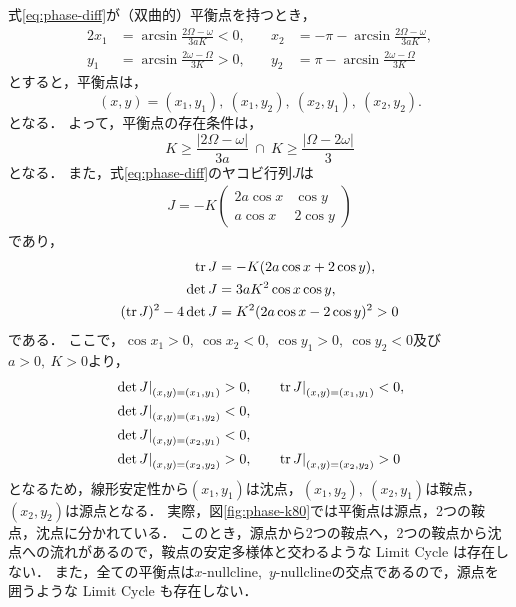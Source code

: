\documentclass[../main]{subfiles}
\begin{document}
    式\eqref{eq:phase-diff}が（双曲的）平衡点を持つとき，
    \begin{alignat*}{2}
        x_1&=\arcsin \frac{2\Omega-\omega}{3aK}<0,&\quad x_2&=-\pi-\arcsin \frac{2\Omega-\omega}{3aK},\\
        y_1&=\arcsin \frac{2\omega-\Omega}{3K}>0,&\quad y_2&=\pi-\arcsin \frac{2\omega-\Omega}{3K}
    \end{alignat*}
    とすると，平衡点は，
    \begin{equation*}
        (x,y)=(x_1,y_1),\ (x_1,y_2),\ (x_2,y_1),\ (x_2,y_2).
    \end{equation*}
    となる．
    よって，平衡点の存在条件は，
    \begin{equation}
        K\geq \frac{|2\Omega-\omega|}{3a}\ \cap \ K\geq \frac{|\Omega-2\omega|}{3}
    \end{equation}
    となる．
    また，式\eqref{eq:phase-diff}のヤコビ行列$J$は
    \begin{align*}
        J=-K\begin{pmatrix}
            2a\cos x&\cos y\\
            a\cos x&2\cos y
        \end{pmatrix}
    \end{align*}
    であり，
    \begin{align}
        \tr J&=-K(2a\cos x+2\cos y),\\
        \det J&=3aK^2\cos x\cos y,\\
        (\tr J)^2-4\det J&=K^2(2a\cos x-2\cos y)^2> 0
    \end{align}
    である．
    ここで，$\cos x_1>0,\ \cos x_2<0,\ \cos y_1>0,\ \cos y_2<0$及び$a>0,\ K>0$より，
    \begin{alignat*}{2}
        \left.\det J \right|_{(x,y)=(x_1,y_1)}&>0, &\quad  \left.\tr J \right|_{(x,y)=(x_1,y_1)}&<0,\\
        \left.\det J \right|_{(x,y)=(x_1,y_2)}&<0, & &\\
        \left.\det J \right|_{(x,y)=(x_2,y_1)}&<0, & &\\
        \left.\det J \right|_{(x,y)=(x_2,y_2)}&>0, &\quad  \left.\tr J \right|_{(x,y)=(x_2,y_2)}&>0
    \end{alignat*}
    となるため，線形安定性から$(x_1,y_1)$は沈点，$(x_1,y_2),\ (x_2,y_1)$は鞍点，$(x_2,y_2)$は源点となる．
    実際，図\ref{fig:phase-k80}では平衡点は源点，2つの鞍点，沈点に分かれている．
    このとき，源点から2つの鞍点へ，2つの鞍点から沈点への流れがあるので，鞍点の安定多様体と交わるような Limit Cycle は存在しない．
    また，全ての平衡点は$x$-nullcline,\ $y$-nullclineの交点であるので，源点を囲うような Limit Cycle も存在しない．
\end{document}
